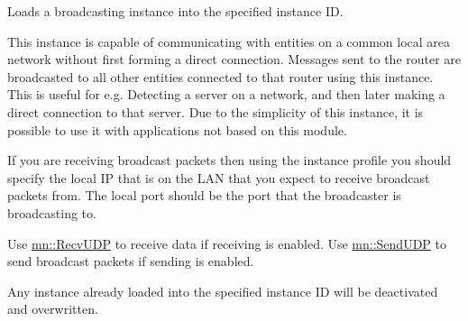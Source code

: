 Loads a broadcasting instance into the specified instance ID. 

This instance is capable of communicating with entities on a common local area network without first forming a direct connection. Messages sent to the router are broadcasted to all other entities connected to that router using this instance. This is useful for e.g. Detecting a server on a network, and then later making a direct connection to that server. Due to the simplicity of this instance, it is possible to use it with applications not based on this module.

If you are receiving broadcast packets then using the instance profile you should specify the local IP that is on the LAN that you expect to receive broadcast packets from. The local port should be the port that the broadcaster is broadcasting to.\par
\par


Use \hyperlink{namespacemn_a62627020941d9c6cdd1e3e3d1919c28b}{mn::RecvUDP} to receive data if receiving is enabled. Use \hyperlink{namespacemn_af9ce5db9b08f558c31f581c791ae422c}{mn::SendUDP} to send broadcast packets if sending is enabled.\par
\par


Any instance already loaded into the specified instance ID will be deactivated and overwritten.


